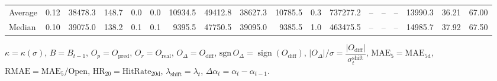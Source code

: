 \begin{threeparttable}
{\begin{tabular}{lrrrrrrrrrrrrrrrrr}
Average &     0.12 & 38478.3 &             148.7 &               0.0 &                0.0 &            10934.5 & 49412.8 & 38627.3 &    10785.5 &                      0.3 &            737277.2 &         -- &        -- &             -- &          13990.3 &           36.21 &                  67.00 \\
 Median &     0.10 & 39075.0 &             138.2 &               0.1 &                0.1 &             9395.5 & 47750.5 & 39095.0 &     9385.5 &                      1.0 &            463475.5 &         -- &        -- &             -- &          14985.7 &           37.92 &                  67.50 \\
\bottomrule
\end{tabular}
}
\begin{tablenotes}\footnotesize
\item $\kappa=\kappa(\sigma)$, $B=B_{t-1}$, $O_p=O_{\text{pred}}$, $O_r=O_{\text{real}}$, $O_\Delta=O_{\text{diff}}$, $\mathrm{sgn}\,O_\Delta=\operatorname{sign}(O_{\text{diff}})$, $|O_\Delta|/\sigma=\dfrac{|O_{\text{diff}}|}{\sigma_t^{\text{shift}}}$, $\mathrm{MAE}_5=\mathrm{MAE}_{5\text{d}}$, $\mathrm{RMAE}= \mathrm{MAE}_5 / \text{Open}$, $\mathrm{HR}_{20}=\mathrm{HitRate}_{20\text{d}}$, 
$\lambda_{\text{shift}}=\lambda_t$, 
$\Delta\alpha_t=\alpha_t-\alpha_{t-1}$.
\end{tablenotes}
\end{threeparttable}
\endgroup

